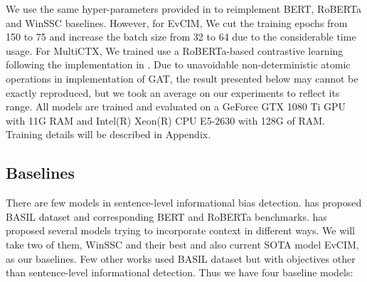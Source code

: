 \documentclass[letterpaper]{article} %
\begin{document}
We use the same hyper-parameters provided in \citep{van-den-berg-markert-2020-context} to reimplement BERT, RoBERTa and WinSSC baselines. However, for EvCIM, We cut the training epochs from 150 to 75 and increase the batch size from 32 to 64 due to the considerable time usage. For MultiCTX, We trained  use a RoBERTa-based contrastive learning following the implementation in \citep{gao2021simcse}. Due to unavoidable non-deterministic atomic operations in implementation of GAT, the result presented below may cannot be exactly reproduced, but we took an average on our experiments to reflect its range. All models are trained and evaluated on a GeForce GTX 1080 Ti GPU with 11G RAM and Intel(R) Xeon(R) CPU E5-2630 with 128G of RAM. Training details will be described in Appendix.



\subsection{Baselines}

There are few models in sentence-level informational bias detection. \citet{fan-etal-2019-plain} has proposed BASIL dataset and corresponding BERT and RoBERTa benchmarks. \citet{cohan-etal-2019-pretrained} has proposed several models trying to incorporate context in different ways. We will take two of them, WinSSC and their best and also current SOTA model EvCIM, as our baselines. Few other works used BASIL dataset but with objectives other than sentence-level informational detection. Thus we have four baseline models:
\end{document}
